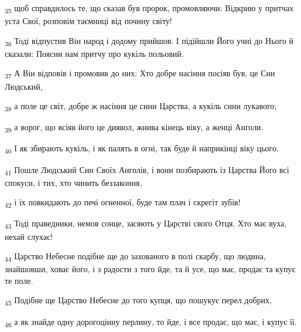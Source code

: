 \begin{tcolorbox}
\textsubscript{35} щоб справдилось те, що сказав був пророк, промовляючи: Відкрию у притчах уста Свої, розповім таємниці від почину світу!
\end{tcolorbox}
\begin{tcolorbox}
\textsubscript{36} Тоді відпустив Він народ і додому прийшов. І підійшли Його учні до Нього й сказали: Поясни нам притчу про кукіль польовий.
\end{tcolorbox}
\begin{tcolorbox}
\textsubscript{37} А Він відповів і промовив до них: Хто добре насіння посіяв був, це Син Людський,
\end{tcolorbox}
\begin{tcolorbox}
\textsubscript{38} а поле це світ, добре ж насіння це сини Царства, а кукіль сини лукавого;
\end{tcolorbox}
\begin{tcolorbox}
\textsubscript{39} а ворог, що всіяв його це диявол, жнива кінець віку, а женці Анголи.
\end{tcolorbox}
\begin{tcolorbox}
\textsubscript{40} І як збирають кукіль, і як палять в огні, так буде й наприкінці віку цього.
\end{tcolorbox}
\begin{tcolorbox}
\textsubscript{41} Пошле Людський Син Своїх Анголів, і вони позбирають із Царства Його всі спокуси, і тих, хто чинить беззаконня,
\end{tcolorbox}
\begin{tcolorbox}
\textsubscript{42} і їх повкидають до печі огненної, буде там плач і скрегіт зубів!
\end{tcolorbox}
\begin{tcolorbox}
\textsubscript{43} Тоді праведники, немов сонце, засяють у Царстві свого Отця. Хто має вуха, нехай слухає!
\end{tcolorbox}
\begin{tcolorbox}
\textsubscript{44} Царство Небесне подібне ще до захованого в полі скарбу, що людина, знайшовши, ховає його, і з радости з того йде, та й усе, що має, продає та купує те поле.
\end{tcolorbox}
\begin{tcolorbox}
\textsubscript{45} Подібне ще Царство Небесне до того купця, що пошукує перел добрих,
\end{tcolorbox}
\begin{tcolorbox}
\textsubscript{46} а як знайде одну дорогоцінну перлину, то йде, і все продає, що має, і купує її.
\end{tcolorbox}
